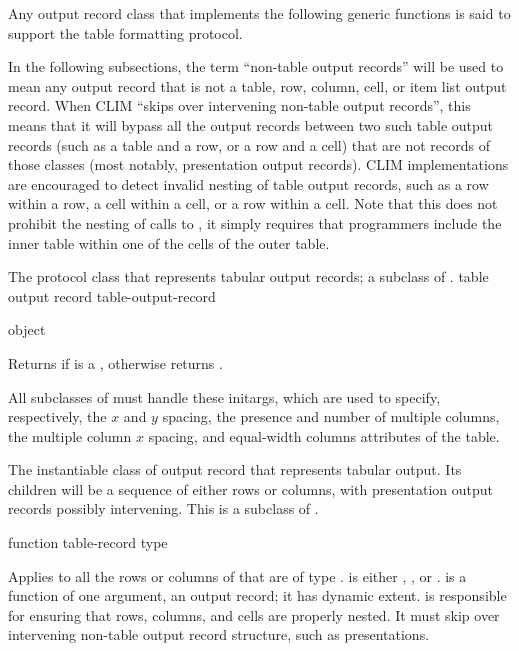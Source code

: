 Any output record class that implements the following generic functions is said
to support the table formatting protocol.

In the following subsections, the term ``non-table output records'' will be used
to mean any output record that is not a table, row, column, cell, or item list
output record.  When CLIM ``skips over intervening non-table output records'',
this means that it will bypass all the output records between two such table
output records (such as a table and a row, or a row and a cell) that are not
records of those classes (most notably, presentation output records).  CLIM
implementations are encouraged to detect invalid nesting of table output
records, such as a row within a row, a cell within a cell, or a row within a
cell.  Note that this does not prohibit the nesting of calls to
, it simply requires that programmers include the inner
table within one of the cells of the outer table.



The protocol class that represents tabular output records; a subclass of
.
 {table output record} {table-output-record}

 {object}

Returns  if  is a , otherwise
returns .


All subclasses of  must handle these initargs,
which are used to specify, respectively, the $x$ and $y$ spacing, the
presence and number of multiple columns, the multiple column $x$
spacing, and equal-width columns attributes of the table.


The instantiable class of output record that represents tabular output.  Its
children will be a sequence of either rows or columns, with presentation output
records possibly intervening.  This is a subclass of .

 {function table-record type}

Applies  to all the rows or columns of  that
are of type .   is either , , or
.   is a function of one argument, an output
record; it has dynamic extent.   is responsible
for ensuring that rows, columns, and cells are properly nested.  It must skip
over intervening non-table output record structure, such as presentations.

